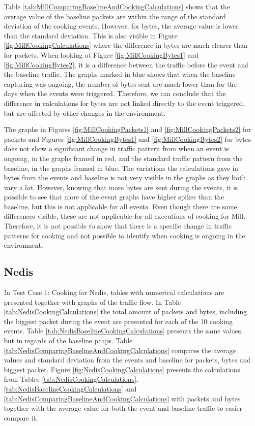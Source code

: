 Table \ref{tab:MillComparingBaselineAndCookingCalculations} shows that the average value of the baseline packets are within the range of the standard deviation of the cooking events. However, for bytes, the average value is lower than the standard deviation. This is also visible in Figure \ref{fig:MillCookingCalculations} where the difference in bytes are much clearer than for packets. When looking at Figure \ref{fig:MillCookingBytes1} and \ref{fig:MillCookingBytes2}, it is a difference between the traffic before the event and the baseline traffic. The graphs marked in blue shows that when the baseline capturing was ongoing, the number of bytes sent are much lower than for the days when the events were triggered. Therefore, we can conclude that the difference in calculations for bytes are not linked directly to the event triggered, but are affected by other changes in the environment.

The graphs in Figures \ref{fig:MillCookingPackets1} and \ref{fig:MillCookingPackets2} for packets and Figures \ref{fig:MillCookingBytes1} and \ref{fig:MillCookingBytes2} for bytes does not show a significant change in traffic pattern from when an event is ongoing, in the graphs framed in red, and the standard traffic pattern from the baseline, in the graphs framed in blue. The variations the calculations gave in bytes from the events and baseline is not very visible in the graphs as they both vary a lot. However, knowing that more bytes are sent during the events, it is possible to see that more of the event graphs have higher spikes than the baseline, but this is not applicable for all events. Even though there are some differences visible, these are not applicable for all executions of cooking for Mill. Therefore, it is not possible to show that there is a specific change in traffic patterns for cooking and not possible to identify when cooking is ongoing in the environment. 

\newpage
\subsection{Nedis}
In Test Case 1: Cooking for Nedis, tables with numerical calculations are presented together with graphs of the traffic flow. In Table \ref{tab:NedisCookingCalculations} the total amount of packets and bytes, including the biggest packet during the event are presented for each of the 10 cooking events. Table \ref{tab:NedisBaselineCookingCalculations} presents the same values, but in regards of the baseline pcaps. Table \ref{tab:NedisComparingBaselineAndCookingCalculations} compares the average values and standard deviation from the events and baseline for packets, bytes and biggest packet. Figure \ref{fig:NedisCookingCalculations} presents the calculations from Tables \ref{tab:NedisCookingCalculations}, \ref{tab:NedisBaselineCookingCalculations} and \ref{tab:NedisComparingBaselineAndCookingCalculations} with packets and bytes together with the average value for both the event and baseline traffic to easier compare it.  

